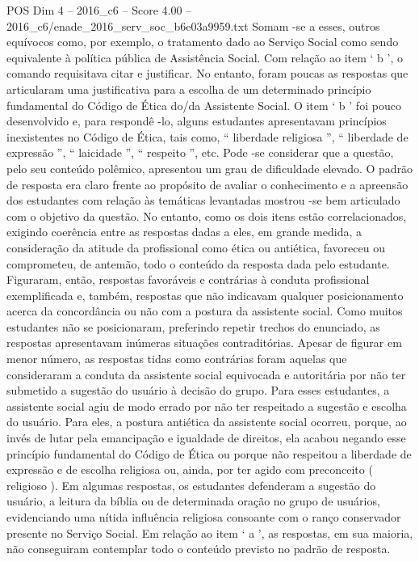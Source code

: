 \begin{textsample}{POS Dim 4 – 2016\_c6 – Score 4.00 – 2016\_c6/enade\_2016\_serv\_soc\_b6e03a9959.txt}
Somam -se a esses, outros equívocos como, por exemplo, o tratamento dado ao Serviço Social como sendo equivalente à política pública de Assistência Social.
Com relação ao item ‘ b ’, o comando requisitava citar e justificar.
No entanto, foram poucas as respostas que articularam uma justificativa para a escolha de um determinado princípio fundamental do Código de Ética do/da Assistente Social.
O item ‘ b ’ foi pouco desenvolvido e, para respondê -lo, alguns estudantes apresentavam princípios inexistentes no Código de Ética, tais como, “ liberdade religiosa ”, “ liberdade de expressão ”, “ laicidade ”, “ respeito ”, etc.
Pode -se considerar que a questão, pelo seu conteúdo polêmico, apresentou um grau de dificuldade elevado.
O padrão de resposta era claro frente ao propósito de avaliar o conhecimento e a apreensão dos estudantes com relação às temáticas levantadas mostrou -se bem articulado com o objetivo da questão.
No entanto, como os dois itens estão correlacionados, exigindo coerência entre as respostas dadas a eles, em grande medida, a consideração da atitude da profissional como ética ou antiética, favoreceu ou comprometeu, de antemão, todo o conteúdo da resposta dada pelo estudante.
Figuraram, então, respostas favoráveis e contrárias à conduta profissional exemplificada e, também, respostas que não indicavam qualquer posicionamento acerca da concordância ou não com a postura da assistente social.
Como muitos estudantes não se posicionaram, preferindo repetir trechos do enunciado, as respostas apresentavam inúmeras situações contraditórias.
Apesar de figurar em menor número, as respostas tidas como contrárias foram aquelas que consideraram a conduta da assistente social equivocada e autoritária por não ter submetido a sugestão do usuário à decisão do grupo.
Para esses estudantes, a assistente social agiu de modo errado por não ter respeitado a sugestão e escolha do usuário.
Para eles, a postura antiética da assistente social ocorreu, porque, ao invés de lutar pela emancipação e igualdade de direitos, ela acabou negando esse princípio fundamental do Código de Ética ou porque não respeitou a liberdade de expressão e de escolha religiosa ou, ainda, por ter agido com preconceito ( religioso ).
Em algumas respostas, os estudantes defenderam a sugestão do usuário, a leitura da bíblia ou de determinada oração no grupo de usuários, evidenciando uma nítida influência religiosa consoante com o ranço conservador presente no Serviço Social.
Em relação ao item ‘ a ’, as respostas, em sua maioria, não conseguiram contemplar todo o conteúdo previsto no padrão de resposta.

\end{textsample}
